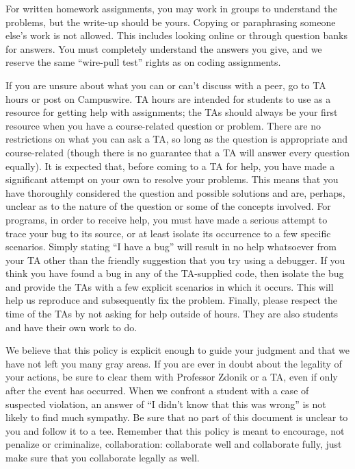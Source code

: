 \documentclass{article}
\begin{document}
For written homework assignments, you may work in groups to understand the problems, but the write-up should be yours. Copying or paraphrasing someone else’s work is not allowed. This includes looking online or through question banks for answers. You must completely understand the answers you give, and we reserve the same ``wire-pull test'' rights as on coding assignments.

If you are unsure about what you can or can't discuss with a peer, go to TA hours or post on Campuswire. TA hours are intended for students to use as a resource for getting help with assignments; the TAs should always be your first resource when you have a course-related question or problem. There are no restrictions on what you can ask a TA, so long as the question is appropriate and course-related (though there is no guarantee that a TA will answer every question equally). It is expected that, before coming to a TA for help, you have made a significant attempt on your own to resolve your problems. This means that you have thoroughly considered the question and possible solutions and are, perhaps, unclear as to the nature of the question or some of the concepts involved. For programs, in order to receive help, you must have made a serious attempt to trace your bug to its source, or at least isolate its occurrence to a few specific scenarios. Simply stating ``I have a bug'' will result in no help whatsoever from your TA other than the friendly suggestion that you try using a debugger. If you think you have found a bug in any of the TA-supplied code, then isolate the bug and provide the TAs with a few explicit scenarios in which it occurs. This will help us reproduce and subsequently fix the problem. Finally, please respect the time of the TAs by not asking for help outside of hours. They are also students and have their own work to do.

We believe that this policy is explicit enough to guide your judgment and that we have not left you many gray areas. If you are ever in doubt about the legality of your actions, be sure to clear them with Professor Zdonik or a TA, even if only after the event has occurred. When we confront a student with a case of suspected violation, an answer of ``I didn’t know that this was wrong'' is not likely to find much sympathy. Be sure that no part of this document is unclear to you and follow it to a tee. Remember that this policy is meant to encourage, not penalize or criminalize, collaboration: collaborate well and collaborate fully, just make sure that you collaborate legally as well.
\end{document}
